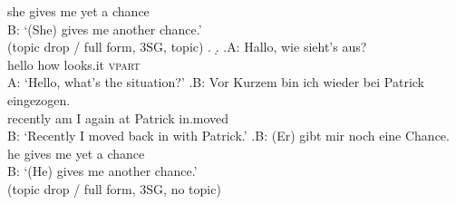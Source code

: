 {} she gives me yet a chance\\
B: `(She) gives me another chance.' \\\phantom{.}\hfill (topic drop / full form, 3SG, topic)
\z.
\d.\label{ex:td.top.full.itemd}
\ag.\label{ex:td.top.full.itemdi}A: Hallo, wie sieht's aus?\\
{} hello how looks.it \textsc{vpart}\\
 A: `Hello, what's the situation?'
\bg.\label{ex:td.top.full.itemdii}B: {Vor Kurzem} bin ich wieder bei Patrick eingezogen.\\
{} recently am I again at Patrick in.moved\\
B: `Recently I moved back in with Patrick.'
\cg.\label{ex:td.top.full.itemdiii}B: (Er) gibt mir noch eine Chance.\\
{} he gives me yet a chance\\
B: `(He) gives me another chance.' \\\phantom{.}\hfill (topic drop / full form, 3SG, no topic)

